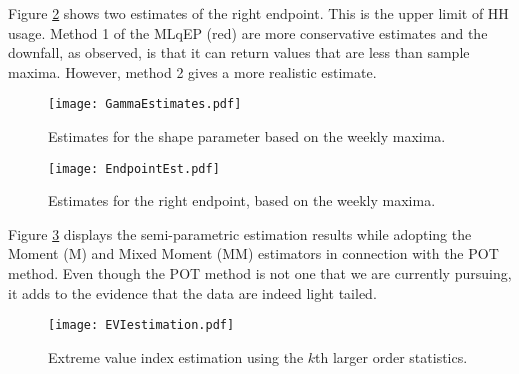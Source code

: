 \documentclass[a4paper]{article}
\begin{document}
Figure \ref{fig:EndPointEst}  shows two estimates of the right endpoint. This is the upper limit of HH usage. Method 1 of the MLqEP (red) are more conservative estimates and the downfall, as observed, is that it can return values that are less than sample maxima. However, method 2 gives a more realistic estimate.

\begin{figure}
\begin{center}
\texttt{[image: GammaEstimates.pdf]}
\caption{Estimates for the shape parameter based on the weekly maxima.} \label{fig:gammaEst}
\end{center}
\end{figure}

\begin{figure}
\begin{center}
\texttt{[image: EndpointEst.pdf]}
\caption{Estimates for the right endpoint, based on the weekly maxima.} \label{fig:EndPointEst}
\end{center}
\end{figure}

Figure \ref{fig:POTEst} displays the semi-parametric estimation results while adopting the Moment (M) and Mixed Moment (MM) estimators in connection with the POT method. Even though the POT method is not one that we are currently pursuing, it adds to the evidence that the data are indeed light tailed.

\begin{figure}
\begin{center}
\texttt{[image: EVIestimation.pdf]}
\caption{Extreme value index estimation using the $k$th larger order statistics.} \label{fig:POTEst}
\end{center}
\end{figure}


\end{document}
